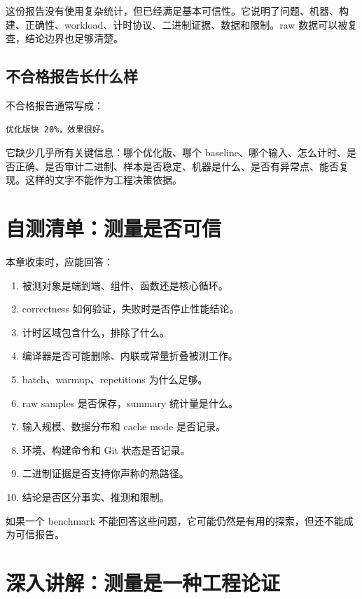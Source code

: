 这份报告没有使用复杂统计，但已经满足基本可信性。它说明了问题、机器、构建、正确性、workload、计时协议、二进制证据、数据和限制。raw 数据可以被复查，结论边界也足够清楚。

\subsection{不合格报告长什么样}

不合格报告通常写成：

\begin{lstlisting}
优化版快 20%，效果很好。
\end{lstlisting}

它缺少几乎所有关键信息：哪个优化版、哪个 baseline、哪个输入、怎么计时、是否正确、是否审计二进制、样本是否稳定、机器是什么、是否有异常点、能否复现。这样的文字不能作为工程决策依据。

\section{自测清单：测量是否可信}

本章收束时，应能回答：

\begin{enumerate}
  \item 被测对象是端到端、组件、函数还是核心循环。
  \item correctness 如何验证，失败时是否停止性能结论。
  \item 计时区域包含什么，排除了什么。
  \item 编译器是否可能删除、内联或常量折叠被测工作。
  \item batch、warmup、repetitions 为什么足够。
  \item raw samples 是否保存，summary 统计量是什么。
  \item 输入规模、数据分布和 cache mode 是否记录。
  \item 环境、构建命令和 Git 状态是否记录。
  \item 二进制证据是否支持你声称的热路径。
  \item 结论是否区分事实、推测和限制。
\end{enumerate}

如果一个 benchmark 不能回答这些问题，它可能仍然是有用的探索，但还不能成为可信报告。

\section{深入讲解：测量是一种工程论证}

